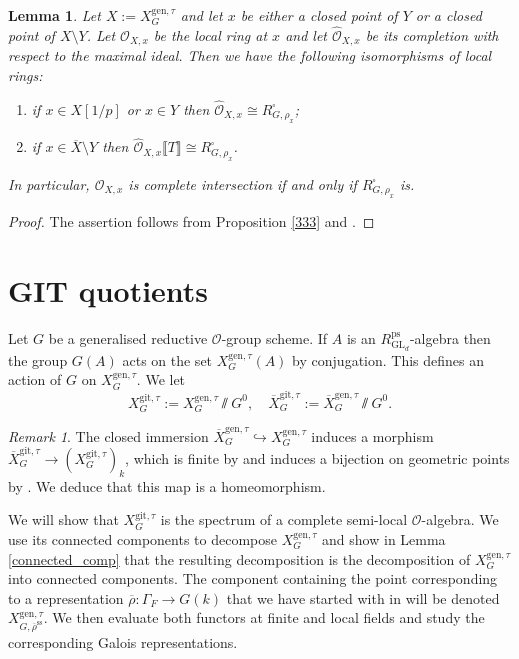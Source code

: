 \documentclass{amsart}
\newtheorem{lem}[prop]{Lemma}
\theoremstyle{definition}
\theoremstyle{remark}
\newtheorem{remar}[prop]{Remark}
\DeclareMathOperator{\GL}{GL}
\newcommand{\OO}{\mathcal O}
\newcommand{\br}[1]{\llbracket #1\rrbracket}
\newcommand{\rhobar}{\overline{\rho}}
\newcommand{\ps}{\mathrm{ps}}
\newcommand{\gen}{\mathrm{gen}}
\newcommand{\gps}{\mathrm{git}}
\newcommand{\Xbar}{\overline{X}}
\newcommand{\RpsGLd}{R^{\ps}_{\GL_d}}
\newcommand{\XgenGtau}{X^{\gen, \tau}_G}
\newcommand{\XbargenGtau}{\overline{X}^{\gen,\tau}_G}
\newcommand{\XgpsGtau}{X^{\gps, \tau}_{G}}
\newcommand{\XbargpsGtau}{\overline{X}^{\gps,\tau}_G}
\newcommand{\rhobarss}{\rhobar^{\mathrm{ss}}}
\begin{document}
\begin{lem}\label{local_ring_def_ring} Let $X:=X^{\gen,\tau}_G$ and let $x$ be either a closed point of 
$Y$ or a closed point of $X\setminus Y$. Let $\OO_{X,x}$ be the local ring at $x$ and let
$\hat{\OO}_{X,x}$ be its completion  with respect to 
the maximal ideal. Then we have the following isomorphisms of local rings: 
\begin{enumerate} 
\item if $x\in X[1/p]$ or $x\in Y$ then $\hat{\OO}_{X,x}\cong R^{\square}_{G, \rho_x}$;
\item if $x\in \Xbar \setminus Y$ then $\hat{\OO}_{X,x}\br{T}\cong R^{\square}_{G, \rho_x}$. 
\end{enumerate} 
In particular, $\OO_{X,x}$ is complete intersection if and only if $R^{\square}_{G, \rho_x}$ is. 
\end{lem}
\begin{proof} The assertion follows from Proposition \ref{333} and \cite[Lemmas 3.36, 3.37]{BIP_new}.
\end{proof} 









\section{GIT quotients}\label{sec_GIT}

Let $G$ be a generalised reductive $\OO$-group scheme. If $A$ is an $\RpsGLd$-algebra then the group
$G(A)$ acts on the set $\XgenGtau(A)$ by conjugation.  This defines an action of $G$ on $\XgenGtau$. We let 
\begin{equation}
\XgpsGtau := \XgenGtau \sslash G^0, \quad \XbargpsGtau:= \XbargenGtau\sslash G^0. 
\end{equation}

\begin{remar}\label{homeo} The closed immersion $\XbargenGtau \hookrightarrow \XgenGtau$ induces a morphism $\XbargpsGtau \rightarrow (\XgpsGtau)_k$, 
which is finite by \cite[Theorem 2]{seshadri} and induces a bijection on geometric points by 
\cite[Theorem 3]{seshadri}. 
We deduce that this map is a homeomorphism.
\end{remar}

We will show that $\XgpsGtau$ is the spectrum of a complete semi-local $\OO$-algebra. 
We use its connected components to decompose  $\XgenGtau$ and show in Lemma \ref{connected_comp} that the resulting decomposition is the decomposition of $\XgenGtau$ into connected components. The component
containing the point corresponding to a representation $\rhobar: \Gamma_F \rightarrow G(k)$ 
that we have started with 
in 
will be denoted $X^{\gen, \tau}_{G, \rhobarss}$. We then evaluate both functors at finite and
local fields and study the corresponding Galois representations.
\end{document}

